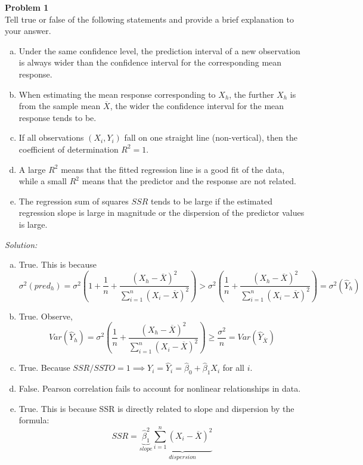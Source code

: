 \documentclass{article}
\newenvironment{problem}[2][Problem]
    { \begin{mdframed}[backgroundcolor=gray!20] \textbf{#1 #2} \\}
    {  \end{mdframed}}
\newenvironment{solution}
    {\textit{Solution:}}
    {}
\begin{document}
\begin{problem}{1}
Tell true or false of the following statements and provide a brief explanation to your answer.
\begin{enumerate}[(a)]
\item Under the same confidence level, the prediction interval of a new observation is always wider than the confidence interval for the corresponding mean response.
\item When estimating the mean response corresponding to $X_h$, the further $X_h$ is from the sample mean $\overline X$, the wider the confidence interval for the mean response tends to be.
\item If all observations $(X_i, Y_i)$ fall on one straight line (non-vertical), then the coefficient of determination $R^2 = 1$.
\item A large $R^2$ means that the fitted regression line is a good fit of the data, while a small $R^2$ means that the predictor and the response are not related.
\item The regression sum of squares $SSR$ tends to be large if the estimated regression slope is large in magnitude or the dispersion of the predictor values is large.
\end{enumerate}
\end{problem}
\begin{solution}
\begin{enumerate}[(a)]
\item True. This is because 
$$\sigma^2(pred_h) = \sigma^2 \left (1 + \frac{1}{n} + \frac{(X_h - \overline{X})^2}{\sum_{i = 1}^n (X_i - \overline{X})^2} \right ) > \sigma^2 \left (\frac{1}{n} + \frac{(X_h - \overline{X})^2}{\sum_{i = 1}^n (X_i - \overline{X})^2} \right ) = \sigma^2(\hat Y_h)$$
\item True. Observe, 
$$Var(\hat Y_h) = \sigma^2 \left (\frac{1}{n} + \frac{(X_h - \overline{X})^2}{\sum_{i = 1}^n (X_i - \overline{X})^2} \right ) \geq \frac{\sigma^2}{n} = Var(\hat Y_{\overline{X}}) $$
\item True. Because $SSR / SSTO = 1 \implies Y_i = \hat Y_i = \hat \beta_0 + \hat \beta_1 X_i$ for all $i$. 
\item False. Pearson correlation fails to account for nonlinear relationships in data. 
\item True. This is because SSR is directly related to slope and dispersion by the formula: 
$$SSR = \underbrace{\hat \beta_1^2}_{slope} \underbrace{\sum_{i = 1}^n 
(X_i - \overline X)^2}_{dispersion}$$
\end{enumerate}
\end{solution}
\end{document}

